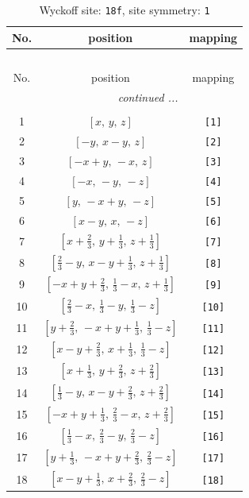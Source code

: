 \documentclass[fleqn,8pt]{jsarticle}
\begin{document}
\begin{longtable}{ccc}
\caption{Wyckoff site: {\tt 18f}, site symmetry: {\tt 1}}
 \\
 \hline \hline
No. & position & mapping \\ \hline \endfirsthead

\multicolumn{2}{l}{\tablename\ \thetable{}} \\
 \hline \hline
No. & position & mapping \\ \hline \endhead

 \hline \hline
\multicolumn{2}{r}{\footnotesize\it continued ...} \\ \endfoot

 \hline \hline
\multicolumn{2}{r}{} \\ \endlastfoot

1 & $\left[ x,\, y,\, z \right]$ & {\tt [1]} \\ \hline
2 & $\left[ - y,\, x - y,\, z \right]$ & {\tt [2]} \\ \hline
3 & $\left[ - x + y,\, - x,\, z \right]$ & {\tt [3]} \\ \hline
4 & $\left[ - x,\, - y,\, - z \right]$ & {\tt [4]} \\ \hline
5 & $\left[ y,\, - x + y,\, - z \right]$ & {\tt [5]} \\ \hline
6 & $\left[ x - y,\, x,\, - z \right]$ & {\tt [6]} \\ \hline
7 & $\left[ x + \frac{2}{3},\, y + \frac{1}{3},\, z + \frac{1}{3} \right]$ & {\tt [7]} \\ \hline
8 & $\left[ \frac{2}{3} - y,\, x - y + \frac{1}{3},\, z + \frac{1}{3} \right]$ & {\tt [8]} \\ \hline
9 & $\left[ - x + y + \frac{2}{3},\, \frac{1}{3} - x,\, z + \frac{1}{3} \right]$ & {\tt [9]} \\ \hline
10 & $\left[ \frac{2}{3} - x,\, \frac{1}{3} - y,\, \frac{1}{3} - z \right]$ & {\tt [10]} \\ \hline
11 & $\left[ y + \frac{2}{3},\, - x + y + \frac{1}{3},\, \frac{1}{3} - z \right]$ & {\tt [11]} \\ \hline
12 & $\left[ x - y + \frac{2}{3},\, x + \frac{1}{3},\, \frac{1}{3} - z \right]$ & {\tt [12]} \\ \hline
13 & $\left[ x + \frac{1}{3},\, y + \frac{2}{3},\, z + \frac{2}{3} \right]$ & {\tt [13]} \\ \hline
14 & $\left[ \frac{1}{3} - y,\, x - y + \frac{2}{3},\, z + \frac{2}{3} \right]$ & {\tt [14]} \\ \hline
15 & $\left[ - x + y + \frac{1}{3},\, \frac{2}{3} - x,\, z + \frac{2}{3} \right]$ & {\tt [15]} \\ \hline
16 & $\left[ \frac{1}{3} - x,\, \frac{2}{3} - y,\, \frac{2}{3} - z \right]$ & {\tt [16]} \\ \hline
17 & $\left[ y + \frac{1}{3},\, - x + y + \frac{2}{3},\, \frac{2}{3} - z \right]$ & {\tt [17]} \\ \hline
18 & $\left[ x - y + \frac{1}{3},\, x + \frac{2}{3},\, \frac{2}{3} - z \right]$ & {\tt [18]} \\
\end{longtable}
\end{document}
